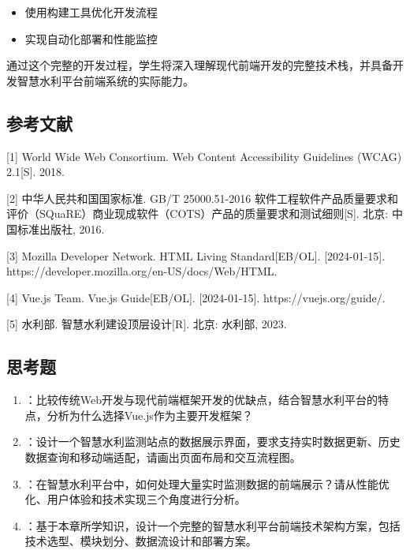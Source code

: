 
\begin{itemize}
\tightlist
\item
  使用构建工具优化开发流程
\item
  实现自动化部署和性能监控
\end{itemize}

通过这个完整的开发过程，学生将深入理解现代前端开发的完整技术栈，并具备开发智慧水利平台前端系统的实际能力。

\hypertarget{ux53c2ux8003ux6587ux732e}{%
\subsection{参考文献}\label{ux53c2ux8003ux6587ux732e}}

{[}1{]} World Wide Web Consortium. Web Content Accessibility Guidelines (WCAG) 2.1{[}S{]}. 2018.

{[}2{]} 中华人民共和国国家标准. GB/T 25000.51-2016 软件工程软件产品质量要求和评价（SQuaRE）商业现成软件（COTS）产品的质量要求和测试细则{[}S{]}. 北京: 中国标准出版社, 2016.

{[}3{]} Mozilla Developer Network. HTML Living Standard{[}EB/OL{]}. {[}2024-01-15{]}. https://developer.mozilla.org/en-US/docs/Web/HTML.

{[}4{]} Vue.js Team. Vue.js Guide{[}EB/OL{]}. {[}2024-01-15{]}. https://vuejs.org/guide/.

{[}5{]} 水利部. 智慧水利建设顶层设计{[}R{]}. 北京: 水利部, 2023.

\hypertarget{ux601dux8003ux9898}{%
\subsection{思考题}\label{ux601dux8003ux9898}}

\begin{enumerate}
\def\labelenumi{\arabic{enumi}.}
\item
  ：比较传统Web开发与现代前端框架开发的优缺点，结合智慧水利平台的特点，分析为什么选择Vue.js作为主要开发框架？
\item
  ：设计一个智慧水利监测站点的数据展示界面，要求支持实时数据更新、历史数据查询和移动端适配，请画出页面布局和交互流程图。
\item
  ：在智慧水利平台中，如何处理大量实时监测数据的前端展示？请从性能优化、用户体验和技术实现三个角度进行分析。
\item
  ：基于本章所学知识，设计一个完整的智慧水利平台前端技术架构方案，包括技术选型、模块划分、数据流设计和部署方案。
\end{enumerate}


